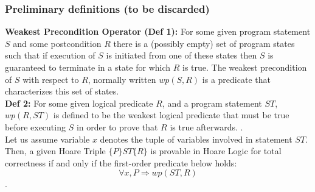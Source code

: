\documentclass{article}
\begin{document}
\subsubsection{Preliminary definitions (to be discarded)}
\textbf{Weakest Precondition Operator (Def 1): }For some given program statement $S$ and some postcondition $R$ there is a (possibly empty) set of program states such that if execution of $S$ is initiated from one of these states then $S$ is guaranteed to terminate in a state for which $R$ is true. The weakest precondition of $S$ with respect to $R$, normally written $wp (S,R)$ is a predicate that characterizes this set of states.\\
\textbf{Def 2: }For some given logical predicate $R$, and a program statement $ST$, $wp(R,ST)$ is defined to be the weakest logical predicate that must be true before executing $S$ in order to prove that $R$ is true afterwards. \cite{wpdefinition}.\\
Let us assume variable $x$ denotes the tuple of variables involved in statement $ST$. Then, a given Hoare Triple $\{P\} ST \{R\}$ is provable in Hoare Logic for total correctness if and only if the first-order predicate below holds:
$$\forall x,P \Rightarrow wp(ST,R)$$.
\end{document}
